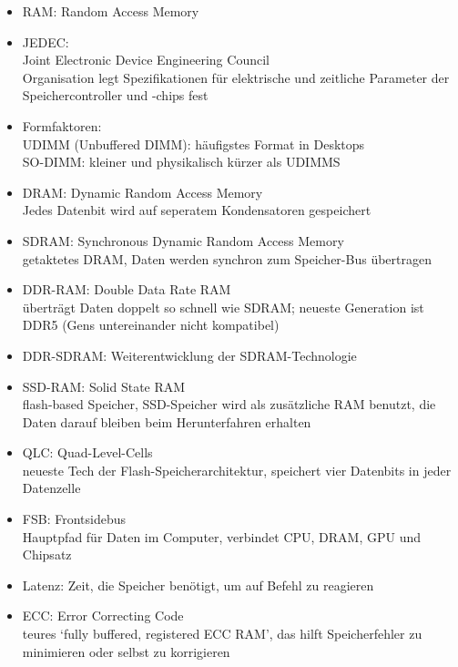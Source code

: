     \begin{tcolorbox}[width=15cm, center, title=RAM Begriffe, coltitle=white, colframe=orange, colback=white!60!orange]
        \begin{itemize}[itemsep=0.1em, parsep=0.3em]
            \item RAM\@: Random Access Memory
            \item JEDEC\@: \\ Joint Electronic Device Engineering Council \\ Organisation legt Spezifikationen für elektrische und zeitliche Parameter der Speichercontroller und -chips fest
            \item Formfaktoren: \\ UDIMM (Unbuffered DIMM): häufigstes Format in Desktops \\ SO-DIMM\@: kleiner und physikalisch kürzer als UDIMMS
            \item DRAM\@: Dynamic Random Access Memory \\ Jedes Datenbit wird auf seperatem Kondensatoren gespeichert
            \item SDRAM\@: Synchronous Dynamic Random Access Memory \\ getaktetes DRAM, Daten werden synchron zum Speicher-Bus übertragen
            \item DDR-RAM\@: Double Data Rate RAM \\ überträgt Daten doppelt so schnell wie SDRAM\@; neueste Generation ist DDR5 (Gens untereinander nicht kompatibel)
            \item DDR-SDRAM\@: Weiterentwicklung der SDRAM-Technologie
            \item SSD-RAM\@: Solid State RAM \\ flash-based Speicher, SSD-Speicher wird als zusätzliche RAM benutzt, die Daten darauf bleiben beim Herunterfahren erhalten
            \item QLC\@: Quad-Level-Cells \\ neueste Tech der Flash-Speicherarchitektur, speichert vier Datenbits in jeder Datenzelle
            \item FSB\@: Frontsidebus \\ Hauptpfad für Daten im Computer, verbindet CPU, DRAM, GPU und Chipsatz
            \item Latenz\@: Zeit, die Speicher benötigt, um auf Befehl zu reagieren
            \item ECC\@: Error Correcting Code \\ teures `fully buffered, registered ECC RAM', das hilft Speicherfehler zu minimieren oder selbst zu korrigieren 
        \end{itemize}
    \end{tcolorbox}

